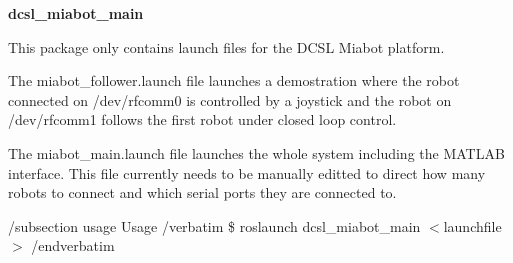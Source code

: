

{\bfseries dcsl\-\_\-miabot\-\_\-main} 

\-This package only contains launch files for the \-D\-C\-S\-L \-Miabot platform.

\-The miabot\-\_\-follower.\-launch file launches a demostration where the robot connected on /dev/rfcomm0 is controlled by a joystick and the robot on /dev/rfcomm1 follows the first robot under closed loop control.

\-The miabot\-\_\-main.\-launch file launches the whole system including the \-M\-A\-T\-L\-A\-B interface. \-This file currently needs to be manually editted to direct how many robots to connect and which serial ports they are connected to.

/subsection usage \-Usage /verbatim \$ roslaunch dcsl\-\_\-miabot\-\_\-main $<$launchfile$>$ /endverbatim 